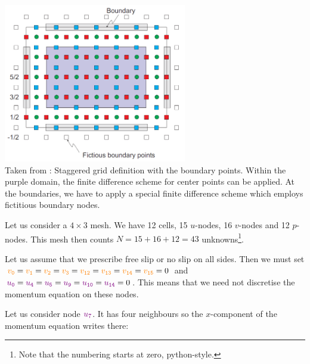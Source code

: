 \begin{center}
\includegraphics[width=8cm]{images/fdm/bk_A}\\
{\captionfont Taken from \textcite{beka}: Staggered grid definition with the boundary points. 
Within the purple domain, the
finite difference scheme for center points can be applied. At the boundaries, we have to apply a
special finite difference scheme which employs fictitious boundary nodes.}
\end{center}

Let us consider a $4\times 3$ mesh.
We have 12 cells, 15 {\color{violet}$u$}-nodes, 
16 {\color{orange}$v$}-nodes and 12 {\color{teal}$p$}-nodes.
This mesh then counts $N=15+16+12=43$ unknowns\footnote{
Note that the numbering starts at zero, python-style.}.



Let us assume that we prescribe free slip or no slip on all sides.
Then we must set 
${\color{orange}v_{\tt 0}}={\color{orange}v_{\tt 1}}={\color{orange}v_{\tt 2}}={\color{orange}v_{\tt 3}}={\color{orange}v_{\tt 12}}={\color{orange}v_{\tt 13}}={\color{orange}v_{\tt 14}}={\color{orange}v_{\tt 15}}=0$
and ${\color{violet} u_{\tt 0}}={\color{violet}u_{\tt 4}}={\color{violet}u_{\tt 5}}
={\color{violet}u_{\tt 9}}={\color{violet}u_{\tt 10}} = {\color{violet}u_{\tt 14}}=0$.
This means that we need not discretise the momentum equation on these nodes.

Let us consider node ${\color{violet} u_{7}}$. It has four neighbours so the $x$-component of 
the momentum equation writes there:

